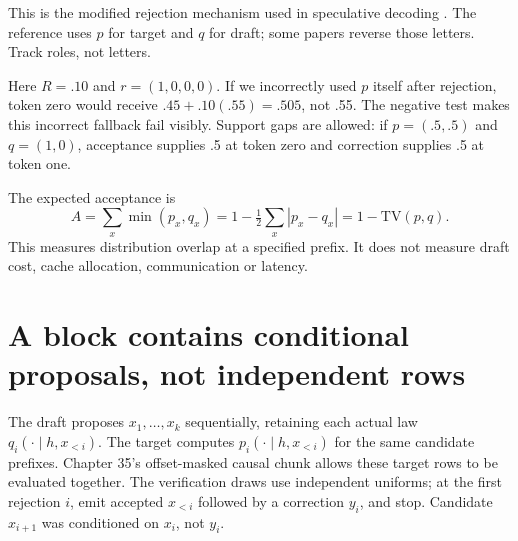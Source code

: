 This is the modified rejection mechanism used in speculative decoding
\cite{evod38:leviathan,evod38:chen}. The reference uses $p$ for target and
$q$ for draft; some papers reverse those letters. Track roles, not letters.

\begin{center}\end{center}

Here $R=.10$ and $r=(1,0,0,0)$. If we incorrectly used $p$ itself after
rejection, token zero would receive $.45+.10(.55)=.505$, not .55.
The negative test makes this incorrect fallback fail visibly. Support
gaps are allowed: if $p=(.5,.5)$ and $q=(1,0)$, acceptance supplies .5 at
token zero and correction supplies .5 at token one.

The expected acceptance is
\[
 A=\sum_x\min(p_x,q_x)
 =1-\tfrac12\sum_x|p_x-q_x|=1-\mathrm{TV}(p,q).
\]
This measures distribution overlap at a specified prefix. It does not
measure draft cost, cache allocation, communication or latency.

\section{A block contains conditional proposals, not independent rows}
\label{evod38:blocks}
The draft proposes $x_1,\ldots,x_k$ sequentially, retaining each actual
law $q_i(\cdot\mid h,x_{<i})$. The target computes
$p_i(\cdot\mid h,x_{<i})$ for the same candidate prefixes. Chapter 35's
offset-masked causal chunk allows these target rows to be evaluated
together. The verification draws use independent uniforms; at the first
rejection $i$, emit accepted $x_{<i}$ followed by a correction $y_i$, and
stop. Candidate $x_{i+1}$ was conditioned on $x_i$, not $y_i$.



